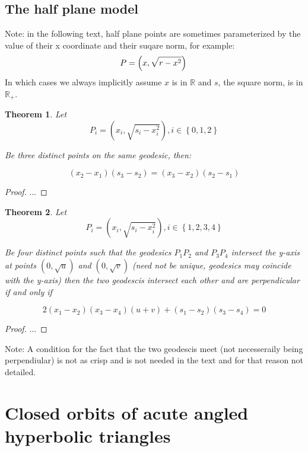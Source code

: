 \documentclass[a4paper,10pt]{article}
\newtheorem{theorem}{Theorem}[section]
\begin{document}
\subsection{The half plane model}

Note: in the following text, half plane points are sometimes parameterized by the
value of their x coordinate and their suqare norm, for example:
\[
P = \left(x, \sqrt{r - x^2}\right)\\
\]
In which cases we always implicitly assume $x$ is in $\mathbb{R}$ and $s$, the square norm, is in $\mathbb{R_+}$.

\label{half-plane-concurrent}
\begin{theorem}

Let
\[
P_i = \left(x_i, \sqrt{s_i - x_i^2}\right), i\in\left\{0,1,2\right\}
\]

Be three distinct points on the same geodesic, then:

\[
  \left(x_2 - x_1\right)\left(s_3 - s_2\right) = \left(x_3 - x_2\right)\left(s_2 - s_1\right)
\]
\end{theorem}
\begin{proof}
...
\end{proof}

\label{half-plane-concurrent}
\begin{theorem}

Let
\[
P_i = \left(x_i, \sqrt{s_i - x_i^2}\right), i\in\left\{1,2,3,4\right\}
\]



Be four distinct points such that the geodesics $P_1P_2$ and $P_3P_4$ intersect the y-axis at
points $(0,\sqrt{u})$ and $(0,\sqrt{v})$ (need not be unique, geodesics may coincide with the y-axis)
then the two geodescis intersect each other and are perpendicular if and only if

\[
2\left(x_1 - x_2\right)\left(x_3 - x_4\right)\left(u + v\right) + \left(s_1 - s_2\right)\left(s_3 - s_4\right) = 0
\]

\end{theorem}

\begin{proof}
...
\end{proof}

Note: A condition for the fact that the two geodescis meet (not necesseraily being perpendiular) 
is not as crisp and is not needed in the text and for that reason not detailed.

\section{Closed orbits of acute angled hyperbolic triangles}
\end{document}
